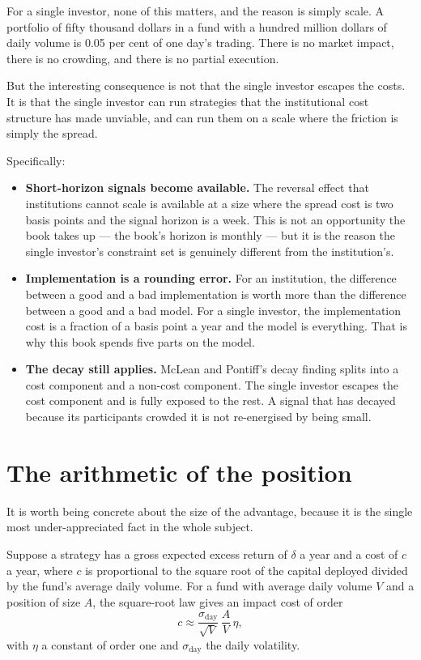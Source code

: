 For a single investor, none of this matters, and the reason is simply
scale. A portfolio of fifty thousand dollars in a fund with a hundred
million dollars of daily volume is 0.05 per cent of one day's trading.
There is no market impact, there is no crowding, and there is no partial
execution.

But the interesting consequence is not that the single investor escapes
the costs. It is that the single investor can run strategies that the
institutional cost structure has made unviable, and can run them on a
scale where the friction is simply the spread.

Specifically:

\begin{itemize}
\item \textbf{Short-horizon signals become available.} The reversal
effect that institutions cannot scale is available at a size where the
spread cost is two basis points and the signal horizon is a week. This is
not an opportunity the book takes up --- the book's horizon is monthly ---
but it is the reason the single investor's constraint set is genuinely
different from the institution's.
\item \textbf{Implementation is a rounding error.} For an institution, the
difference between a good and a bad implementation is worth more than the
difference between a good and a bad model. For a single investor, the
implementation cost is a fraction of a basis point a year and the model is
everything. That is why this book spends five parts on the model.
\item \textbf{The decay still applies.} McLean and Pontiff's decay finding
splits into a cost component and a non-cost component. The single investor
escapes the cost component and is fully exposed to the rest. A signal that
has decayed because its participants crowded it is not re-energised by
being small.
\end{itemize}

\section{The arithmetic of the position}

It is worth being concrete about the size of the advantage, because it is
the single most under-appreciated fact in the whole subject.

Suppose a strategy has a gross expected excess return of \(\delta\) a year
and a cost of \(c\) a year, where \(c\) is proportional to the square root
of the capital deployed divided by the fund's average daily volume. For a
fund with average daily volume \(V\) and a position of size \(A\), the
square-root law gives an impact cost of order
\begin{equation}
c \approx \frac{\sigma_{\mathrm{day}}}{\sqrt{V}}\,
              \frac{A}{V}\,\eta,
\end{equation}
with \(\eta\) a constant of order one and \(\sigma_{\mathrm{day}}\) the
daily volatility.

